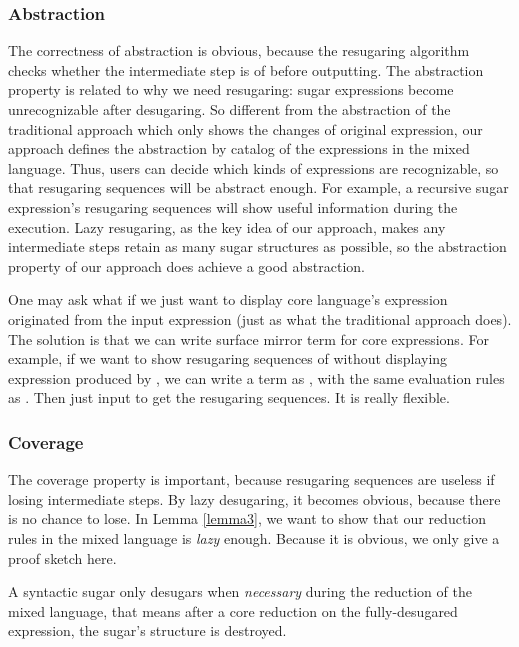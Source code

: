 
\subsubsection{Abstraction}
\label{mark:abs}
The correctness of abstraction is obvious, because the resugaring algorithm checks whether the intermediate step is of  before outputting. The abstraction property is related to why we need resugaring: sugar expressions become unrecognizable after desugaring. So different from the abstraction of the traditional approach which only shows the changes of original expression, our approach defines the abstraction by catalog of the expressions in the mixed language. Thus, users can decide which kinds of expressions are recognizable, so that resugaring sequences will be abstract enough. For example, a recursive sugar expression's resugaring sequences will show useful information during the execution. Lazy resugaring, as the key idea of our approach, makes any intermediate steps retain as many sugar structures as possible, so the abstraction property of our approach does achieve a good abstraction.

One may ask what if we just want to display core language's expression originated from the input expression (just as what the traditional approach does). The solution is that we can write surface mirror term for core expressions. For example, if we want to show resugaring sequences of  without displaying  expression produced by , we can write a  term as , with the same evaluation rules as . Then just input  to get the resugaring sequences. It is really flexible.

\subsubsection{Coverage}
The coverage property is important, because resugaring sequences are useless if losing intermediate steps. By lazy desugaring, it becomes obvious, because there is no chance to lose. In Lemma \ref{lemma3}, we want to show that our reduction rules in the mixed language is \emph{lazy} enough. Because it is obvious, we only give a proof sketch here.
\begin{lemma}[Coverage]
\label{lemma3}
A syntactic sugar only desugars when \emph{necessary} during the reduction of the mixed language, that means after a core reduction on the fully-desugared expression, the sugar's structure is destroyed.
\end{lemma}


